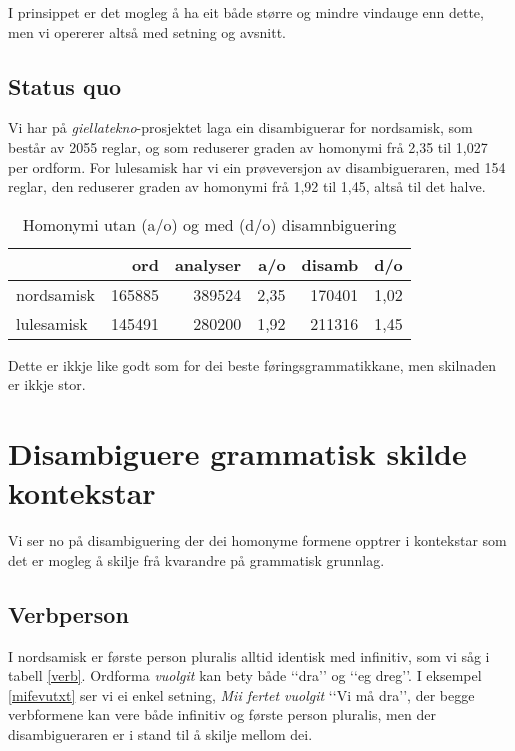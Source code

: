 \documentclass[a4paper,nynorsk]{article}
\begin{document}
I prinsippet er det mogleg å ha eit både større og mindre vindauge enn dette, men vi opererer altså med setning og avsnitt. %


\subsection{Status quo}

Vi har på \textit{giellatekno}-prosjektet laga ein disambiguerar for nordsamisk, som består av 2055 reglar, og som reduserer graden av homonymi frå 2,35  til 1,027 per ordform. For lulesamisk har vi ein prøveversjon av disambigueraren, med 154 reglar, den reduserer graden av homonymi frå 1,92 til 1,45, altså til det halve. %

\begin{table}[htdp]
\caption{Homonymi utan (a/o) og med (d/o) disamnbiguering}
\begin{center}
\begin{tabular}{|l|r|r|r|r|r|}
\hline
 & ord & analyser & a/o & disamb & d/o \\
\hline
nordsamisk & 165885 & 389524 & 2,35 & 170401 & 1,02 \\
lulesamisk &  145491 & 280200 &  1,92 & 211316 & 1,45 \\
\hline
\end{tabular}
\end{center}
\label{posthom}
\end{table}%

Dette er ikkje like godt som for dei beste føringsgrammatikkane, men skilnaden er ikkje stor. %


\section{Disambiguere grammatisk skilde kontekstar}



Vi ser no på disambiguering der dei homonyme formene opptrer i kontekstar som det er mogleg å skilje frå kvarandre på grammatisk grunnlag. %

\subsection{Verbperson}

I nordsamisk er første person pluralis alltid identisk med infinitiv, som vi såg i tabell \ref{verb}. Ordforma \emph{vuolgit} kan bety både ‘‘dra’’ og ‘‘eg dreg’’. I eksempel \ref{mifevutxt} ser vi ei enkel setning, \emph{Mii fertet vuolgit} ‘‘Vi må dra’’,  der begge verbformene kan vere både infinitiv og første person pluralis, men der disambigueraren er i stand til å skilje mellom dei. %
\end{document}
